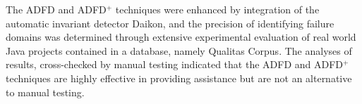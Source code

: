 The ADFD and ADFD$^+$ techniques were enhanced by integration of the automatic invariant detector Daikon, and the precision of identifying failure domains was determined through extensive experimental evaluation of real world Java projects contained in a database, namely Qualitas Corpus. The analyses of results, cross-checked by manual testing indicated that the ADFD and ADFD$^+$ techniques are highly effective in providing assistance but are not an alternative to manual testing.


















